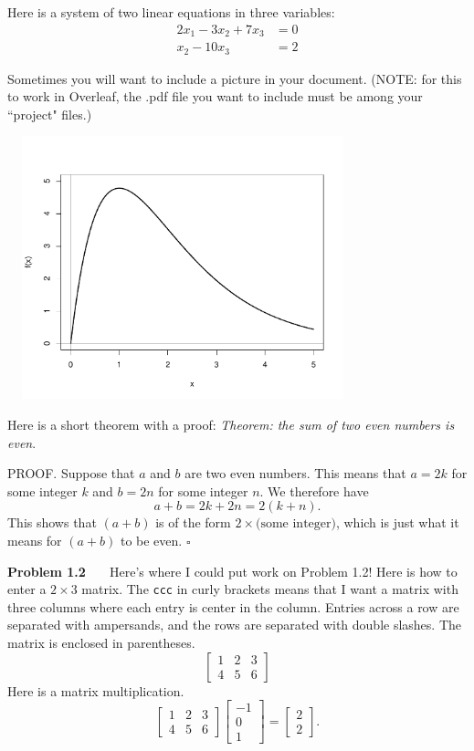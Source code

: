 \documentclass[10pt]{article}
\begin{document}
Here is a system of two linear equations in three variables:
\begin{align*}
2x_1 - 3x_2 + 7x_3 &= 0 \\
x_2 - 10x_3 &= 2
\end{align*}

Sometimes you will want to include a picture in your document.  (NOTE: for this to work in Overleaf, the .pdf file you want to include must be among your ``project" files.)

\begin{center}
\includegraphics[width = 4in, height = 3in]{TemplateFig1.pdf}
\end{center}

Here is a short theorem with a proof: \emph{Theorem: the sum of two even numbers is even}.

PROOF.  Suppose that $a$ and $b$ are two even numbers.  This means that $a = 2k$ for some integer $k$ and $b = 2n$ for some integer $n$.  We therefore have
\[
a+b = 2k + 2n = 2(k+n).
\]
This shows that $(a+b)$ is of the form $2 \times \mbox{(some integer)}$, which is just what it means for $(a+b)$ to be even.  $\square$

\bigskip
\noindent
{\bf Problem 1.2 \ \ } Here's where I could put work on Problem 1.2!  Here is how to enter a $2 \times 3$ matrix.  The {\tt ccc} in curly brackets means that I want a matrix with three columns where each entry is center in the column.   Entries across a row are separated with ampersands, and the rows are separated with double slashes.  The matrix is enclosed in parentheses.
\[
\left[ \begin{array}{ccc}
1 & 2 & 3 \\
4 & 5 & 6
\end{array} \right]
\]
Here is a matrix multiplication.
\[
\left[ \begin{array}{ccc}
1 & 2 & 3 \\
4 & 5 & 6
\end{array} \right]
\left[ \begin{array}{c}
-1 \\ 0 \\ 1
\end{array} \right]
=
\left[ \begin{array}{c}
2 \\ 2
\end{array} \right].
\]
\end{document}
